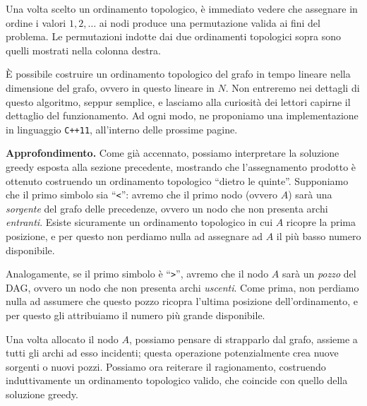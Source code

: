 Una volta scelto un ordinamento topologico, è immediato vedere che assegnare in ordine i valori $1, 2, \dots$ ai nodi produce una permutazione valida ai fini del problema. Le permutazioni indotte dai due ordinamenti topologici sopra sono quelli mostrati nella colonna destra.

È possibile costruire un ordinamento topologico del grafo in tempo lineare nella dimensione del grafo, ovvero in questo lineare in $N$. Non entreremo nei dettagli di questo algoritmo, seppur semplice, e lasciamo alla curiosità dei lettori capirne il dettaglio del funzionamento. Ad ogni modo, ne proponiamo una implementazione in linguaggio \texttt{C++11}, all'interno delle prossime pagine.

\textbf{Approfondimento.} Come già accennato, possiamo interpretare la soluzione greedy esposta alla sezione precedente, mostrando che l'assegnamento prodotto è ottenuto costruendo un ordinamento topologico ``dietro le quinte''. Supponiamo che il primo simbolo sia ``\texttt{<}'': avremo che il primo nodo (ovvero $A$) sarà una \textit{sorgente} del grafo delle precedenze, ovvero un nodo che non presenta archi \emph{entranti}. Esiste sicuramente un ordinamento topologico in cui $A$ ricopre la prima posizione, e per questo non perdiamo nulla ad assegnare ad $A$ il più basso numero disponibile.

Analogamente, se il primo simbolo è ``\texttt{>}'', avremo che il nodo $A$ sarà un \textit{pozzo} del DAG, ovvero un nodo che non presenta archi \emph{uscenti}. Come prima, non perdiamo nulla ad assumere che questo pozzo ricopra l'ultima posizione dell'ordinamento, e per questo gli attribuiamo il numero più grande disponibile.

Una volta allocato il nodo $A$, possiamo pensare di strapparlo dal grafo, assieme a tutti gli archi ad esso incidenti; questa operazione potenzialmente crea nuove sorgenti o nuovi pozzi. Possiamo ora reiterare il ragionamento, costruendo induttivamente un ordinamento topologico valido, che coincide con quello della soluzione greedy.

\newpage
{}
\Codice

\SolN
\colorbox{white}{}

\SolBrute
\colorbox{white}{}

\SolDAG
\colorbox{white}{}
